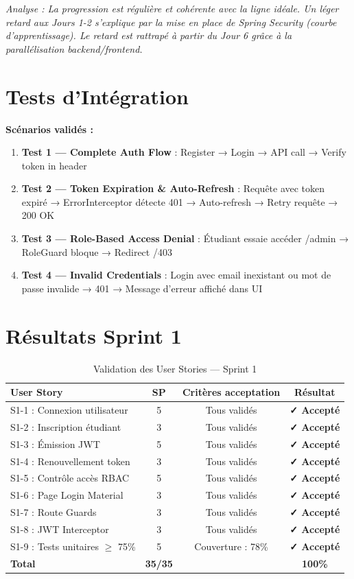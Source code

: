 \documentclass[12pt,a4paper]{report}
\begin{document}
\textit{Analyse : La progression est régulière et cohérente avec la ligne idéale. Un léger retard aux Jours 1-2 s'explique par la mise en place de Spring Security (courbe d'apprentissage). Le retard est rattrapé à partir du Jour 6 grâce à la parallélisation backend/frontend.}

\section{Tests d'Intégration}

\textbf{Scénarios validés :}

\begin{enumerate}[itemsep=0.3em]
    \item \textbf{Test 1 — Complete Auth Flow} : Register → Login → API call → Verify token in header
    \item \textbf{Test 2 — Token Expiration \& Auto-Refresh} : Requête avec token expiré → ErrorInterceptor détecte 401 → Auto-refresh → Retry requête → 200 OK
    \item \textbf{Test 3 — Role-Based Access Denial} : Étudiant essaie accéder /admin → RoleGuard bloque → Redirect /403
    \item \textbf{Test 4 — Invalid Credentials} : Login avec email inexistant ou mot de passe invalide → 401 → Message d'erreur affiché dans UI
\end{enumerate}

\section{Résultats Sprint 1}

\begin{table}[H]
\centering
\caption{Validation des User Stories — Sprint 1}
\begin{tabular}{|l|c|c|c|}
\hline
\textbf{User Story} & \textbf{SP} & \textbf{Critères acceptation} & \textbf{Résultat} \\
\hline
S1-1 : Connexion utilisateur & 5 & Tous validés & \textbf{✓ Accepté} \\
\hline
S1-2 : Inscription étudiant & 3 & Tous validés & \textbf{✓ Accepté} \\
\hline
S1-3 : Émission JWT & 5 & Tous validés & \textbf{✓ Accepté} \\
\hline
S1-4 : Renouvellement token & 3 & Tous validés & \textbf{✓ Accepté} \\
\hline
S1-5 : Contrôle accès RBAC & 5 & Tous validés & \textbf{✓ Accepté} \\
\hline
S1-6 : Page Login Material & 3 & Tous validés & \textbf{✓ Accepté} \\
\hline
S1-7 : Route Guards & 3 & Tous validés & \textbf{✓ Accepté} \\
\hline
S1-8 : JWT Interceptor & 3 & Tous validés & \textbf{✓ Accepté} \\
\hline
S1-9 : Tests unitaires $\geq$ 75\% & 5 & Couverture : 78\% & \textbf{✓ Accepté} \\
\hline
\textbf{Total} & \textbf{35/35} & & \textbf{100\%} \\
\hline
\end{tabular}
\end{table}
\end{document}

